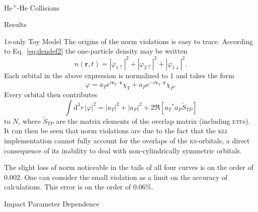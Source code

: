 \documentclass[a5paper, 9 pt]{extreport}
\begin{document}
\begin{chapter}{\texorpdfstring{He\textsuperscript{+}}{He+}-He Collisions \label{chap:hephe}}
\begin{section}{Results \label{sec:hephe-disc}}
\begin{subsection}{1\textit{s}-only Toy Model \label{sec:toy}}
         The origins of the norm violations is easy to trace. According to Eq.~\eqref{eq:dendef2} the
         one-particle density may be written
         \begin{equation} \label{eq:toyden}
            n(\mathbf{r},t) = \left| \varphi_{1 \uparrow}\right|^2
                            + \left| \varphi_{2 \uparrow}\right|^2
                            + \left| \varphi_{1 \downarrow}\right|^2.
         \end{equation}
         Each orbital in the above expression is normalized to 1 and takes the form
         \begin{equation}
            \varphi = a_T e^{i \mathbf{v}_T \cdot \mathbf{r}} \chi_T
                    + a_P e^{-i \mathbf{v}_T \cdot \mathbf{r}} \chi_P.
         \end{equation}
         Every orbital then contributes
         \begin{equation}
            \int \mathrm{d}^3 r \, \left| \varphi \right|^2 = \left| a_T \right|^2
                                                            + \left| a_P \right|^2
            + 2 \Re \left[ {a_T}^* a_P \tilde{S}_{TP} \right]
         \end{equation}
         to $N$, where $\tilde{S}_{TP}$ are the matrix elements of the overlap matrix (including
         \textsc{etf}s). It can then be seen that norm violations are due to the fact that
         the \textsc{kli} implementation cannot fully account for the overlaps of the
         \textsc{ks}-orbitals, a direct consequence of its inability to deal with non-cylindrically
         symmetric orbitals.

         The slight loss of norm noticeable in the tails of all four curves is on the order of $0.002$.
         One can consider the small violation as a limit on the accuracy of calculations. This error is
         on the order of $0.06 \%$.

      \end{subsection}

      \begin{subsection}{Impact Parameter Dependence \label{sec:hephepb}}


\end{subsection}
\end{section}
\end{chapter}
\end{document}
